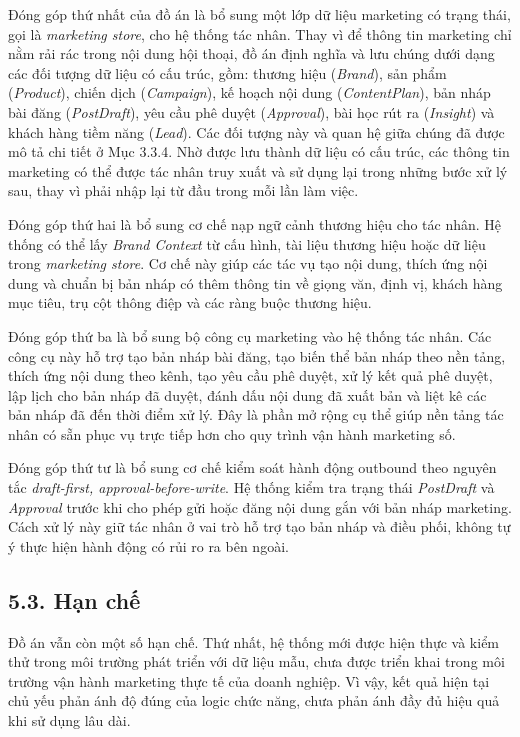\documentclass[a4paper]{article}
\newcommand{\secx}[1]{\subsection*{#1}\phantomsection\addcontentsline{toc}{subsection}{#1}}
\begin{document}
Đóng góp thứ nhất của đồ án là bổ sung một lớp dữ liệu marketing có trạng thái, gọi là \textit{marketing store}, cho hệ thống tác nhân. Thay vì để thông tin marketing chỉ nằm rải rác trong nội dung hội thoại, đồ án định nghĩa và lưu chúng dưới dạng các đối tượng dữ liệu có cấu trúc, gồm: thương hiệu (\textit{Brand}), sản phẩm (\textit{Product}), chiến dịch (\textit{Campaign}), kế hoạch nội dung (\textit{ContentPlan}), bản nháp bài đăng (\textit{PostDraft}), yêu cầu phê duyệt (\textit{Approval}), bài học rút ra (\textit{Insight}) và khách hàng tiềm năng (\textit{Lead}). Các đối tượng này và quan hệ giữa chúng đã được mô tả chi tiết ở Mục 3.3.4. Nhờ được lưu thành dữ liệu có cấu trúc, các thông tin marketing có thể được tác nhân truy xuất và sử dụng lại trong những bước xử lý sau, thay vì phải nhập lại từ đầu trong mỗi lần làm việc.

Đóng góp thứ hai là bổ sung cơ chế nạp ngữ cảnh thương hiệu cho tác nhân. Hệ thống có thể lấy \textit{Brand Context} từ cấu hình, tài liệu thương hiệu hoặc dữ liệu trong \textit{marketing store}. Cơ chế này giúp các tác vụ tạo nội dung, thích ứng nội dung và chuẩn bị bản nháp có thêm thông tin về giọng văn, định vị, khách hàng mục tiêu, trụ cột thông điệp và các ràng buộc thương hiệu.

Đóng góp thứ ba là bổ sung bộ công cụ marketing vào hệ thống tác nhân. Các công cụ này hỗ trợ tạo bản nháp bài đăng, tạo biến thể bản nháp theo nền tảng, thích ứng nội dung theo kênh, tạo yêu cầu phê duyệt, xử lý kết quả phê duyệt, lập lịch cho bản nháp đã duyệt, đánh dấu nội dung đã xuất bản và liệt kê các bản nháp đã đến thời điểm xử lý. Đây là phần mở rộng cụ thể giúp nền tảng tác nhân có sẵn phục vụ trực tiếp hơn cho quy trình vận hành marketing số.

Đóng góp thứ tư là bổ sung cơ chế kiểm soát hành động outbound theo nguyên tắc \textit{draft-first, approval-before-write}. Hệ thống kiểm tra trạng thái \textit{PostDraft} và \textit{Approval} trước khi cho phép gửi hoặc đăng nội dung gắn với bản nháp marketing. Cách xử lý này giữ tác nhân ở vai trò hỗ trợ tạo bản nháp và điều phối, không tự ý thực hiện hành động có rủi ro ra bên ngoài.

\secx{5.3. Hạn chế}

Đồ án vẫn còn một số hạn chế. Thứ nhất, hệ thống mới được hiện thực và kiểm thử trong môi trường phát triển với dữ liệu mẫu, chưa được triển khai trong môi trường vận hành marketing thực tế của doanh nghiệp. Vì vậy, kết quả hiện tại chủ yếu phản ánh độ đúng của logic chức năng, chưa phản ánh đầy đủ hiệu quả khi sử dụng lâu dài.
\end{document}
